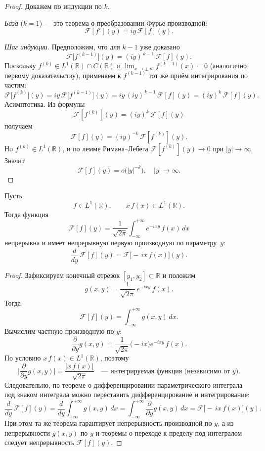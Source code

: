 \begin{proof}
    Докажем по индукции по $k$.

    \textit{База} ($k=1$) — это теорема о преобразовании Фурье производной:
    \[
        \mathcal F[f'](y)
        =iy\,\mathcal F[f](y).
    \]

    \textit{Шаг индукции.} Предположим, что для $k-1$ уже доказано
    \[
        \mathcal F\bigl[f^{(k-1)}\bigr](y)
        =(iy)^{\,k-1}\,\mathcal F[f](y).
    \]
    Поскольку $f^{(k)}\in L^1(\mathbb R)\cap C(\mathbb R)$ и $\lim_{x\to\pm\infty}f^{(k-1)}(x)=0$
    (аналогично первому доказательству), применяем к $f^{(k-1)}$ тот же приём интегрирования по частям:
    \[
        \mathcal F\bigl[f^{(k)}\bigr](y)
        =iy\,\mathcal F\bigl[f^{(k-1)}\bigr](y)
        =iy\,(iy)^{\,k-1}\,\mathcal F[f](y)
        =(iy)^k\,\mathcal F[f](y).
    \]
    Асимптотика. Из формулы
    \[
        \mathcal F[f^{(k)}](y)
        =(iy)^k\,\mathcal F[f](y)
    \]
    получаем
    \[
        \mathcal F[f](y)
        =(iy)^{-k}\,\mathcal F[f^{(k)}](y).
    \]
    Но $f^{(k)}\in L^1(\mathbb R)$, и по лемме Римана–Лебега
    $\mathcal F[f^{(k)}](y)\to0$ при $|y|\to\infty$. Значит
    \[
        \mathcal F[f](y)
        =o\bigl(|y|^{-k}\bigr),
        \quad |y|\to\infty.
    \]
\end{proof}


\begin{theorem}
    Пусть
    \[
        f\in L^1(\mathbb R),
        \qquad
        x\,f(x)\in L^1(\mathbb R).
    \]
    Тогда функция
    \[
        \mathcal F[f](y)
        =\frac1{\sqrt{2\pi}}\int_{-\infty}^{+\infty}e^{-i x y}\,f(x)\,dx
    \]
    непрерывна и имеет непрерывную первую производную по параметру~$y$:
    \[
        \frac{d}{dy}\,\mathcal F[f](y)
        =\mathcal F\bigl[-\,i x\,f(x)\bigr](y).
    \]
\end{theorem}

\begin{proof}
    Зафиксируем конечный отрезок $[y_1,y_2]\subset\mathbb R$ и положим
    \[
        g(x,y)
        =\frac1{\sqrt{2\pi}}\,e^{-i x y}\,f(x).
    \]
    Тогда
    \[
        \mathcal F[f](y)=\int_{-\infty}^{+\infty}g(x,y)\,dx.
    \]
    Вычислим частную производную по $y$:
    \[
        \frac{\partial}{\partial y}g(x,y)
        =\frac1{\sqrt{2\pi}}\bigl(-i x\bigr)e^{-i x y}\,f(x).
    \]
    По условию $x\,f(x)\in L^1(\mathbb R)$, поэтому
    \[
        \biggl|\frac{\partial}{\partial y}g(x,y)\biggr|
        =\frac{|x\,f(x)|}{\sqrt{2\pi}}
        \quad\text{— интегрируемая функция (независимо от $y$).}
    \]
    Следовательно, по теореме о дифференцировании параметрического
    интеграла под знаком интеграла можно переставить дифференцирование и
    интегрирование:
    \[
        \frac{d}{dy}\,\mathcal F[f](y)
        =\frac{d}{dy}\int_{-\infty}^{+\infty}g(x,y)\,dx
        =\int_{-\infty}^{+\infty}\frac{\partial}{\partial y}g(x,y)\,dx
        =\mathcal F\bigl[-\,i x\,f(x)\bigr](y).
    \]
    При этом та же теорема гарантирует непрерывность производной по $y$,
    а из непрерывности $g(x,y)$ по $y$ и теоремы о переходе к пределу под интегралом следует непрерывность $\mathcal F[f](y)$.
\end{proof}

